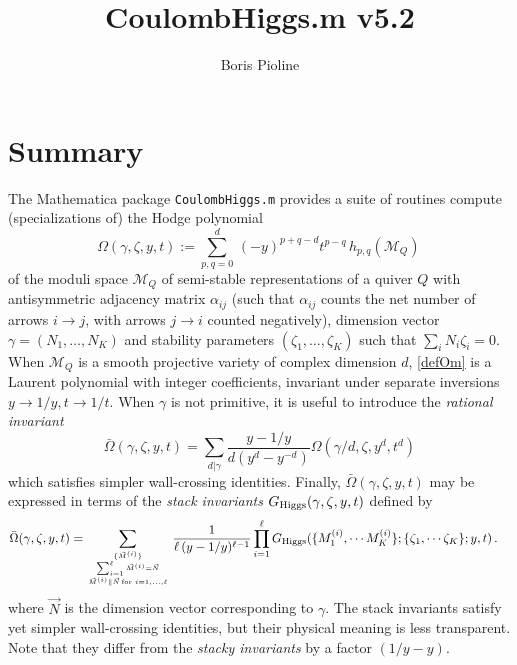 \documentclass[12pt]{JHEP3}
\title{CoulombHiggs.m v5.2}
\author{Boris Pioline}
\newcommand{\be}{\begin{equation}}
\newcommand{\ee}{\end{equation}}
\newcommand\bOm{\bar\Omega}
\newcommand{\cM}{\mathcal{M}}
\newcommand{\gR}{G_{\rm Higgs}}
\begin{document}
\maketitle

\baselineskip 15pt

\tableofcontents

\medskip

\section{Summary}

The  {\sc Mathematica} package {\tt CoulombHiggs.m} provides a suite of routines compute (specializations of) the Hodge polynomial 
\be
\label{defOm}
\Omega(\gamma,\zeta,y,t) := 
\sum_{p,q=0}^{d}\, (-y)^{p+q-d} t^{p-q}\, h_{p,q}(\cM_Q)\, 
\ee
of the moduli space $\cM_Q$ of semi-stable representations of a quiver $Q$ with antisymmetric
adjacency matrix $\alpha_{ij}$ (such that $\alpha_{ij}$ counts the net number of arrows $i\to j$, with
arrows $j\to i$ counted negatively),  dimension vector $\gamma=(N_1,\dots, N_K)$ and stability parameters $(\zeta_1,\dots, \zeta_K)$ such that $\sum_i N_i \zeta_i=0$. When $\cM_Q$ is 
a smooth projective variety of complex dimension $d$, \eqref{defOm} is a Laurent polynomial  with integer coefficients, invariant under separate inversions $y\to 1/y, t\to 1/t$. When $\gamma$ is not primitive, it is useful to introduce the {\it rational invariant}
\be
\label{defbOm}
\bOm(\gamma,\zeta,y,t)=\sum_{d|\gamma} \frac{y-1/y}{d(y^d-y^{-d})} \Omega(\gamma/d,\zeta,y^d,t^d)\ee 
which satisfies simpler wall-crossing identities. Finally, $\bOm(\gamma,\zeta,y,t)$ may be expressed 
in terms of the {\it stack invariants} $G_{\rm Higgs}(\gamma,\zeta,y,t)$ defined by \cite[(4.1)]{Manschot:2013sya}
\be
\label{eq:inversestackinv}
\begin{split}
\bOm(\gamma,\zeta,y,t) 
  =& %
  \sum_{\{\vec M^{(i)}\} \atop {
  \sum_{i=1}^\ell \vec M^{(i)}=\vec N \atop  \vec M^{(i)}\parallel \vec N
  \,\mathrm{for}\,\, i=1,\dots,\ell}}
\frac{1}{\ell\,(y-1/y)^{\ell-1}}  
\prod_{i=1}^\ell 
\gR(\{ M^{(i)}_1, \cdots M^{(i)}_K \};
\{\zeta_1, \cdots \zeta_K\};y,t)
\, .  
\end{split}
\ee
where $\vec N$ is the dimension vector corresponding to $\gamma$. The stack invariants 
satisfy yet simpler wall-crossing identities, but their physical meaning is less transparent.
Note that they differ from the {\it stacky invariants} by a factor $(1/y-y)$.
\end{document}
